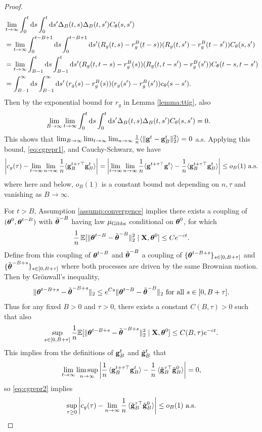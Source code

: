 \begin{proof}
\begin{align*}
&\lim_{t \to \infty}
\int_0^t \mathrm{d} s \int_0^t \mathrm{d} s' \Delta_B(t,s)\Delta_B(t,s')C_\theta(s,s')\\
&=\lim_{t \to \infty}
\int_0^{t-B+1} \mathrm{d} s \int_0^{t-B+1} \mathrm{d} s'
(R_g(t,s)-r_g^B(t-s))(R_g(t,s')-r_g^B(t-s'))C_\theta(s,s')\\
&=\lim_{t \to \infty}
\int_{B-1}^t \mathrm{d} s \int_{B-1}^t \mathrm{d} s' (R_g(t,t-s)-r_g^B(s))
(R_g(t,t-s')-r_g^B(s'))C_\theta(t-s,t-s')\\
&=\int_{B-1}^\infty \mathrm{d} s \int_{B-1}^\infty \mathrm{d} s'\,(r_g(s)-r_g^B(s))
(r_g(s')-r_g^B(s'))c_\theta(s-s').
\end{align*}
Then by the exponential bound for $r_g$ in Lemma \ref{lemma:ttig}, also
\begin{align*}
&\lim_{B \to \infty} \lim_{t \to \infty}
\int_0^t \mathrm{d} s \int_0^t \mathrm{d} s' \Delta_B(t,s)\Delta_B(t,s')C_\theta(s,s')=0.
\end{align*}
This shows that
$\lim_{B \to \infty} \lim_{t \to \infty}
\lim_{n \to \infty} \frac{1}{n}\langle \|\mathbf{g}^t-\mathbf{g}_B^t\|_2^2 \rangle=0$ a.s.
Applying this bound, \eqref{eq:cgrepr1}, and Cauchy-Schwarz, we have
\begin{align}\label{eq:cgrepr2}
\left|c_g(\tau)-\lim_{t \to \infty}
\lim_{n \to \infty} \frac{1}{n}\langle \mathbf{g}_B^{t+\tau\top}\mathbf{g}_B^t \rangle\right|
=\left|\lim_{t \to \infty} \lim_{n \to \infty}
\frac{1}{n}\langle \mathbf{g}^{t+\tau\top}\mathbf{g}^t \rangle
-\frac{1}{n}\langle \mathbf{g}_B^{t+\tau\top}\mathbf{g}_B^t \rangle\right| \leq o_B(1) \text{
a.s.}
\end{align}
where here and below, $o_B(1)$ is a constant bound not depending on $n,\tau$
and vanishing as $B \to \infty$.

For $t>B$, Assumption \ref{assump:convergence} implies
there exists a coupling of
$(\boldsymbol{\theta}^0,\boldsymbol{\theta}^{t-B})$ with $\tilde {\boldsymbol{\theta}}^{-B}$ 
having law $\mu_{\mathrm{Gibbs}}$ conditional on $\boldsymbol{\theta}^0$, for which
\[\frac{1}{n}\,\mathbb{E}[\|\boldsymbol{\theta}^{t-B}-\tilde {\boldsymbol{\theta}}^{-B}\|_2^2 \mid \mathbf{X},\boldsymbol{\theta}^0]
\leq Ce^{-ct}.\]
Define from this coupling of $\boldsymbol{\theta}^{t-B}$ and $\tilde{\boldsymbol{\theta}}^{-B}$ a coupling
of $\{\boldsymbol{\theta}^{t-B+s}\}_{s \in [0,B+\tau]}$ and
$\{\tilde {\boldsymbol{\theta}}^{-B+s}\}_{s \in [0,B+\tau]}$ where both processes are driven
by the same Brownian motion. Then by Gr\"onwall's inequality,
\[\|\boldsymbol{\theta}^{t-B+s}-\tilde {\boldsymbol{\theta}}^{-B+s}\|_2 \leq e^{Cs}
\|\boldsymbol{\theta}^{t-B}-\tilde {\boldsymbol{\theta}}^{-B}\|_2 \text{ for all } s \in [0,B+\tau].\]
Thus for any fixed $B>0$ and $\tau>0$,
there exists a constant $C(B,\tau)>0$ such that also
\[\sup_{s \in [0,B+\tau]} \frac{1}{n}\mathbb{E}[\|\boldsymbol{\theta}^{t-B+s}
-\tilde{\boldsymbol{\theta}}^{-B+s}\|_2^2 \mid \mathbf{X},\boldsymbol{\theta}^0] \leq C(B,\tau)e^{-ct}.\]
This implies from the definitions of $\mathbf{g}_B^t$ and $\tilde {\mathbf{g}}_B^t$ that
\[\lim_{t \to \infty}\limsup_{n \to \infty}
\left|\frac{1}{n}\,\langle \mathbf{g}_B^{t+\tau\top} \mathbf{g}_B^t\rangle
-\frac{1}{n}\,\langle \tilde {\mathbf{g}}_B^{\tau\top} \tilde {\mathbf{g}}_B^0\rangle
\right|=0,\]
so \eqref{eq:cgrepr2} implies 
\begin{equation}\label{eq:cgrepr3}
\sup_{\tau \geq 0}\left|c_g(\tau)-\lim_{n \to \infty}
\frac{1}{n}\,\langle \tilde{\mathbf{g}}_B^{\tau\top}\tilde {\mathbf{g}}_B^0
\rangle\right| \leq o_B(1) \text{ a.s.}
\end{equation}


\end{proof}
